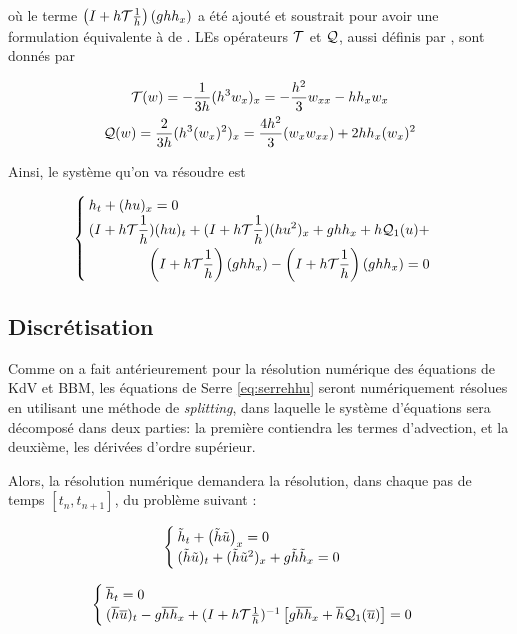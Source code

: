 \noindent où le terme $\left(I + h\mathcal{T}\frac{1}{h} \right)(ghh_x)$ a été ajouté et soustrait pour avoir une formulation équivalente à de \cite{Bonneton2011}. LEs opérateurs $\mathcal{T}$ et $\mathcal{Q}$, aussi définis par \cite{Bonneton2011}, sont donnés par

\begin{gather*}
	\mathcal{T}(w) = -\frac{1}{3h}(h^3w_x)_x = -\frac{h^2}{3}w_{xx} - hh_xw_x \\
	\mathcal{Q}(w) = \frac{2}{3h}(h^3(w_x)^2  )_x = \frac{4h^2}{3}(w_xw_{xx}) + 2hh_x(w_x)^2
\end{gather*}

\indent Ainsi, le système qu'on va résoudre est 

\begin{equation}
\label{eq:serrehhu}
\begin{cases}
h_t + (hu)_x = 0 \\
\begin{split}
(I + h\mathcal{T}\frac{1}{h}) (hu)_t + (I + h\mathcal{T}\frac{1}{h})(hu^2)_x + ghh_x + h\mathcal{Q}_1(u) + \\ \left(I + h\mathcal{T}\frac{1}{h} \right) (ghh_x) - \left(I + h\mathcal{T}\frac{1}{h} \right) (ghh_x) = 0
\end{split}
\end{cases}
\end{equation}


\subsection{Discrétisation}

\indent Comme on a fait antérieurement pour la résolution numérique des équations de KdV et BBM, les équations de Serre \eqref{eq:serrehhu} seront numériquement résolues en utilisant une méthode de \emph{splitting}, dans laquelle le système d'équations sera décomposé dans deux parties: la première contiendra les termes d'advection, et la deuxième, les dérivées d'ordre supérieur.

\indent Alors, la résolution numérique demandera la résolution, dans chaque pas de temps $[t_n, t_{n+1}]$, du problème suivant :

\begin{equation}
	\label{eq:splitSerre1}
	\begin{cases}
		\tilde{h}_t + \left(\tilde{h}\tilde{u}\right)_x = 0 \\
		(\tilde{h}\tilde{u})_t + (\tilde{h}\tilde{u}^2)_x + g\tilde{h}\tilde{h}_x = 0 
	\end{cases}	
\end{equation}

\begin{equation}
	\label{eq:splitSerre2}
	\begin{cases}
		\overline{h}_t = 0 \\
		(\overline{h}\overline{u})_t  -g\overline{h}\overline{h}_x + (I + h\mathcal{T}\frac{1}{h})^{-1}\left[ g\overline{h}\overline{h}_x + \overline{h}\mathcal{Q}_1(\overline{u}) \right] = 0
	\end{cases}	
\end{equation}

